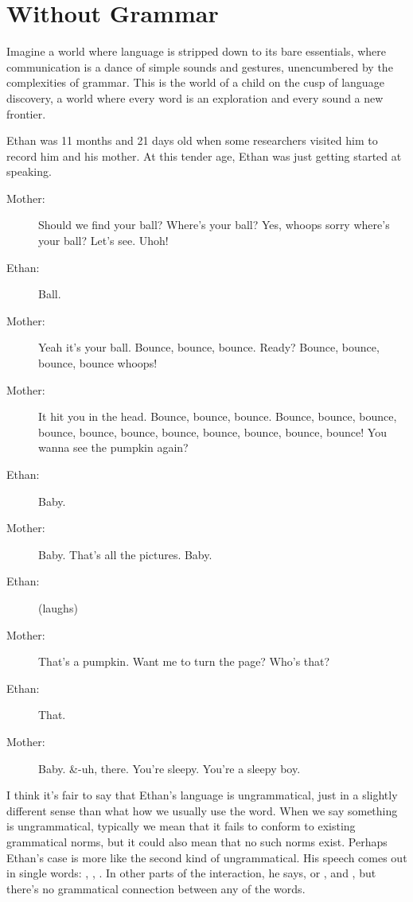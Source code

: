 \chapter{Without Grammar}

Imagine a world where language is stripped down to its bare essentials, where communication is a dance of simple sounds and gestures, unencumbered by the complexities of grammar. This is the world of a child on the cusp of language discovery, a world where every word is an exploration and every sound a new frontier.

Ethan was 11 months and 21 days old when some researchers visited him to record him and his mother. At this tender age, Ethan was just getting started at speaking.


\begin{description}
    \item[Mother:] Should we find your ball? Where's your ball? Yes, whoops sorry where's your ball? Let's see. Uhoh!
    \item[Ethan:] Ball.
    \item[Mother:] Yeah it's your ball. Bounce, bounce, bounce. Ready? Bounce, bounce, bounce, bounce whoops!
    \item[Mother:] It hit you in the head. Bounce, bounce, bounce. Bounce, bounce, bounce, bounce, bounce, bounce, bounce, bounce, bounce, bounce, bounce! You wanna see the pumpkin again?
    \item[Ethan:] Baby.
    \item[Mother:] Baby. That's all the pictures. Baby.
    \item[Ethan:] (laughs)
    \item[Mother:] That's a pumpkin. Want me to turn the page? Who's that?
    \item[Ethan:] That.
    \item[Mother:] Baby. \&-uh, there. You're sleepy. You're a sleepy boy.
\end{description}

I think it's fair to say that Ethan's language is ungrammatical, just in a slightly different sense than what how we usually use the word. When we say something is ungrammatical, typically we mean that it fails to conform to existing grammatical norms, but it could also mean that no such norms exist. Perhaps Ethan's case is more like the second kind of ungrammatical. His speech comes out in single words: , , . In other parts of the interaction, he says,  or , and , but there's no grammatical connection between any of the words.

